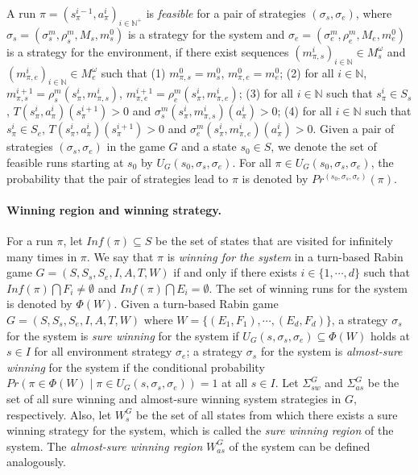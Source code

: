 \documentclass[runningheads,a4paper]{llncs}
\begin{document}
A run $\pi = (s_{\pi}^{i-1}, a_{\pi}^i)_{i \in \mathbb{N}^+}$ is \emph{feasible} for a pair of strategies $(\sigma_s, \sigma_e)$, where $\sigma_s = (\sigma^m_s, \rho^m_s, M_s, m^0_s)$ is a strategy for the system and $\sigma_e = (\sigma^m_e, \rho^m_e, M_e, m^0_e)$ is a strategy for the environment, if there exist sequences $(m_{\pi,s}^i)_{i \in \mathbb{N}} \in M_s^{\omega}$ and $(m_{\pi,e}^i)_{i \in \mathbb{N}} \in M_e^{\omega}$ such that (1) $m_{\pi,s}^0 = m^0_s$, $m_{\pi,e}^0 = m^0_e$; (2) for all $i \in \mathbb{N}$, $m_{\pi,s}^{i+1} = \rho^m_s(s_{\pi}^i, m_{\pi,s}^i)$, $m_{\pi,e}^{i+1} = \rho^m_e(s_{\pi}^i, m_{\pi,e}^i)$; (3) for all $i \in \mathbb{N}$ such that $s_{\pi}^i \in S_s$, $T(s_{\pi}^i, a_{\pi}^i)(s_{\pi}^{i+1}) > 0$ and $\sigma^m_s(s_{\pi}^i, m_{\pi,s}^i)(a_{\pi}^i) > 0$; (4) for all $i \in \mathbb{N}$ such that $s_{\pi}^i \in S_e$, $T(s_{\pi}^i, a_{\pi}^i)(s_{\pi}^{i+1}) > 0$ and $\sigma^m_e(s_{\pi}^i, m_{\pi,e}^i)(a_{\pi}^i) > 0$. Given a pair of strategies $(\sigma_s, \sigma_e)$ in the game $G$ and a state $s_0 \in S$, we denote the set of feasible runs starting at $s_0$ by $U_G(s_0, \sigma_s, \sigma_e)$. For all $\pi \in U_G(s_0, \sigma_s, \sigma_e)$, the probability that the pair of strategies lead to $\pi$ is denoted by $Pr^{(s_0, \sigma_s, \sigma_e)}(\pi)$. 



\paragraph{Winning region and winning strategy.} For a run $\pi$, let $Inf(\pi) \subseteq S$ be the set of states that are visited for infinitely many times in $\pi$. We say that $\pi$ is \emph{winning for the system} in a turn-based Rabin game $G = (S, S_s, S_e, I, A, T, W)$ if and only if there exists $i \in \{1, \cdots, d\}$ such that $Inf(\pi) \bigcap F_i \not= \emptyset$ and $Inf(\pi) \bigcap E_i = \emptyset$. The set of winning runs for the system is denoted by $\Phi(W)$. 
Given a turn-based Rabin game $G = (S, S_s, S_e, I, A, T, W)$ where $W = \{ (E_1, F_1), \cdots, (E_d, F_d) \}$, a strategy $\sigma_s$ for the system is \emph{sure winning} for the system if $U_G(s, \sigma_s, \sigma_e) \subseteq \Phi(W)$ holds at $s \in I$ for all environment strategy $\sigma_e$; a strategy $\sigma_s$ for the system is \emph{almost-sure winning} for the system if the conditional probability $Pr(\pi \in \Phi(W) \mid \pi \in U_G(s, \sigma_s, \sigma_e)) = 1$ at all $s \in I$. Let $\Sigma_{sw}^G$ and $\Sigma_{as}^G$ be the set of all sure winning and almost-sure winning system strategies in $G$, respectively. Also, let $W_{s}^G$ be the set of all states from which there exists a sure winning strategy for the system, which is called the \emph{sure winning region} of the system. The \emph{almost-sure winning region} $W_{as}^G$ of the system can be defined analogously.
\end{document}
